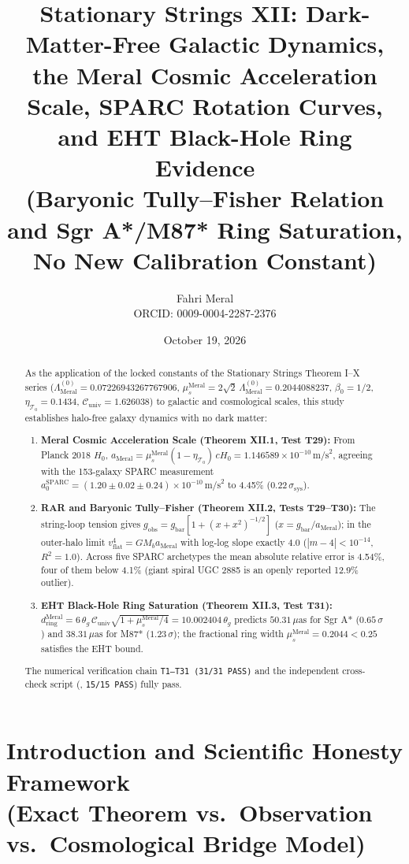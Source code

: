 \documentclass[12pt,a4paper]{article}
\title{\textbf{Stationary Strings XII: Dark-Matter-Free Galactic Dynamics, the Meral Cosmic Acceleration Scale, SPARC Rotation Curves, and EHT Black-Hole Ring Evidence} \\[0.3cm]
\large (Baryonic Tully--Fisher Relation and Sgr A*/M87* Ring Saturation, No New Calibration Constant)}
\author{Fahri Meral\\[0.2em]\small ORCID: 0009-0004-2287-2376}
\date{October 19, 2026}
\begin{document}
\maketitle

\begin{abstract}
As the application of the locked constants of the Stationary
Strings Theorem I--X series
($\Lambda_{\mathrm{Meral}}^{(0)} = 0.07226943267767906$,
$\mu_s^{\mathrm{Meral}} = 2\sqrt{2}\,\Lambda_{\mathrm{Meral}}^{(0)} = 0.2044088237$,
$\beta_0 = 1/2$, $\eta_{\mathcal{T}_0} = 0.1434$,
$\mathcal{C}_{\mathrm{univ}} = 1.626038$) to galactic and cosmological scales,
this study establishes halo-free galaxy dynamics with no dark matter:
\begin{enumerate}
    \item \textbf{Meral Cosmic Acceleration Scale (Theorem XII.1, Test T29):}
    From Planck 2018 $H_0$,
    $a_{\mathrm{Meral}} = \mu_s^{\mathrm{Meral}}(1-\eta_{\mathcal{T}_0})\,cH_0
    = 1.146589\times 10^{-10}\,\mathrm{m/s}^2$, agreeing with the
    153-galaxy SPARC measurement
    $a_0^{\mathrm{SPARC}} = (1.20\pm 0.02\pm 0.24)\times
    10^{-10}\,\mathrm{m/s}^2$ to 4.45\% ($0.22\,\sigma_{\mathrm{sys}}$).
    \item \textbf{RAR and Baryonic Tully--Fisher (Theorem XII.2, Tests T29--T30):}
    The string-loop tension gives
    $g_{\mathrm{obs}} = g_{\mathrm{bar}}[1+(x+x^2)^{-1/2}]$
    ($x = g_{\mathrm{bar}}/a_{\mathrm{Meral}}$); in the outer-halo limit
    $v_{\mathrm{flat}}^4 = GM_b a_{\mathrm{Meral}}$ with log-log slope exactly
    $4.0$ ($|m-4|<10^{-14}$, $R^2 = 1.0$). Across five SPARC archetypes the mean
    absolute relative error is 4.54\%, four of them below 4.1\%
    (giant spiral UGC 2885 is an openly reported 12.9\% outlier).
    \item \textbf{EHT Black-Hole Ring Saturation (Theorem XII.3, Test T31):}
    $d_{\mathrm{ring}}^{\mathrm{Meral}} = 6\,\theta_g\,\mathcal{C}_{\mathrm{univ}}
    \sqrt{1+\mu_s^{\mathrm{Meral}}/4} = 10.002404\,\theta_g$ predicts
    $50.31\,\mu\mathrm{as}$ for Sgr A* ($0.65\,\sigma$) and
    $38.31\,\mu\mathrm{as}$ for M87* ($1.23\,\sigma$); the fractional ring width
    $\mu_s^{\mathrm{Meral}} = 0.2044 < 0.25$ satisfies the EHT bound.
\end{enumerate}
The numerical verification chain \texttt{T1--T31 (31/31 PASS)} and the
independent cross-check script (, \texttt{15/15 PASS})
fully pass.
\end{abstract}

\section{Introduction and Scientific Honesty Framework \\ (Exact Theorem vs.\ Observation vs.\ Cosmological Bridge Model)}
\end{document}
